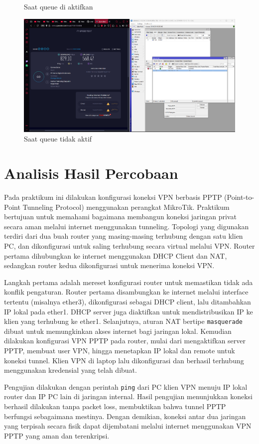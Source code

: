 \begin{enumerate}
\begin{figure}[H]
        \caption{Saat queue di aktifkan}
        \label{fig:gambar4}
    \end{figure}
    \begin{figure}[H]
        \centering
        \includegraphics[width=0.5\linewidth]{P1/img/15.png}
        \caption{Saat queue tidak aktif}
        \label{fig:gambar4}
    \end{figure}
\end{enumerate}

\section{Analisis Hasil Percobaan}
Pada praktikum ini dilakukan konfigurasi koneksi VPN berbasis PPTP (Point-to-Point Tunneling Protocol) menggunakan perangkat MikroTik. Praktikum bertujuan untuk memahami bagaimana membangun koneksi jaringan privat secara aman melalui internet menggunakan tunneling. Topologi yang digunakan terdiri dari dua buah router yang masing-masing terhubung dengan satu klien PC, dan dikonfigurasi untuk saling terhubung secara virtual melalui VPN. Router pertama dihubungkan ke internet menggunakan DHCP Client dan NAT, sedangkan router kedua dikonfigurasi untuk menerima koneksi VPN.

Langkah pertama adalah mereset konfigurasi router untuk memastikan tidak ada konflik pengaturan. Router pertama disambungkan ke internet melalui interface tertentu (misalnya ether3), dikonfigurasi sebagai DHCP client, lalu ditambahkan IP lokal pada ether1. DHCP server juga diaktifkan untuk mendistribusikan IP ke klien yang terhubung ke ether1. Selanjutnya, aturan NAT bertipe \texttt{masquerade} dibuat untuk memungkinkan akses internet bagi jaringan lokal. Kemudian dilakukan konfigurasi VPN PPTP pada router, mulai dari mengaktifkan server PPTP, membuat user VPN, hingga menetapkan IP lokal dan remote untuk koneksi tunnel. Klien VPN di laptop lalu dikonfigurasi dan berhasil terhubung menggunakan kredensial yang telah dibuat.

Pengujian dilakukan dengan perintah \texttt{ping} dari PC klien VPN menuju IP lokal router dan IP PC lain di jaringan internal. Hasil pengujian menunjukkan koneksi berhasil dilakukan tanpa packet loss, membuktikan bahwa tunnel PPTP berfungsi sebagaimana mestinya. Dengan demikian, koneksi antar dua jaringan yang terpisah secara fisik dapat dijembatani melalui internet menggunakan VPN PPTP yang aman dan terenkripsi.



